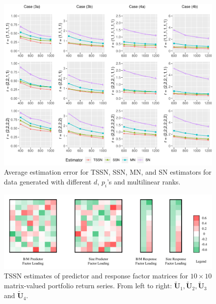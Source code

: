 \documentclass[12pt]{article}
\newcommand{\bm}{\boldsymbol}
\begin{document}
\begin{figure}[t!]
	\centering
    \includegraphics[width=\textwidth]{Rplot_sim3.pdf}
	\caption{Average estimation error for TSSN, SSN, MN, and SN estimators for data generated with different $d$,  $p_i$'s and multilinear ranks.}\label{fg:simulation3}
\end{figure}

\newpage
\clearpage

\begin{figure}[t]
	\begin{center}
		\includegraphics[width=\linewidth]{factor_loading1.pdf}
		\vspace{-15mm}
		\caption{TSSN estimates of predictor and response factor matrices for $10\times 10$  matrix-valued portfolio return series. From left to right: $\bm{\widetilde{U}}_1, \bm{\widetilde{U}}_2, \bm{\widetilde{U}}_3$ and $\bm{\widetilde{U}}_4$.}
		\label{fig:factor1}
	\end{center}
\end{figure}
\end{document}
